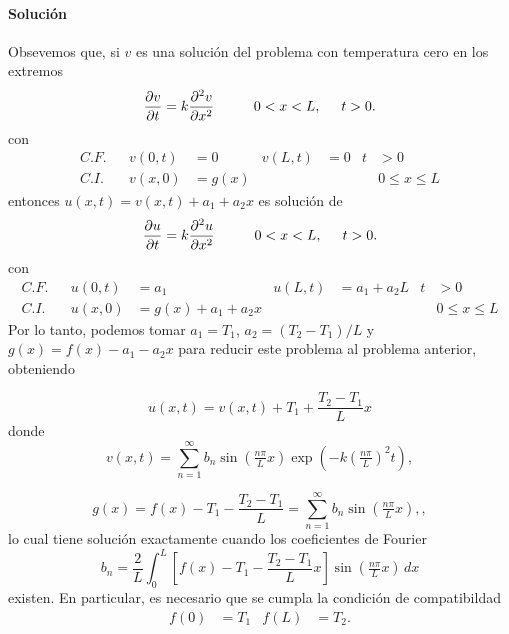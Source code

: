 \documentclass[11pt,letterpaper]{report}
\newcommand\<{\langle}
\renewcommand\>{\rangle}
\begin{document}
\paragraph{Solución}
Obsevemos que, si $v$ es una solución del problema con
temperatura cero en los extremos
\[
  \frac{\partial v}{\partial t}
  = k
  \frac{\partial ^2 v}{\partial x^2}
  \hspace{10mm} 0<x<L,
  \hspace{5mm} t>0.
\]
con
\begin{align*}
  C.F. && v(0,t) &= 0 & v(L,t) &= 0 &t&>0 \\
  C.I. && v(x,0) &= g(x) & &&& 0\leq x\leq L
\end{align*}
entonces $u(x,t)=v(x,t)+a_1+a_2x$ es solución de
\[
  \frac{\partial u}{\partial t}
  = k
  \frac{\partial ^2 u}{\partial x^2}
  \hspace{10mm} 0<x<L,
  \hspace{5mm} t>0.
\]
con
\begin{align*}
  C.F. && u(0,t) &= a_1 & u(L,t) &= a_1+a_2L &t&>0 \\
  C.I. && u(x,0) &= g(x)+a_1+a_2x & &&& 0\leq x\leq L
\end{align*}
Por lo tanto, podemos tomar $a_1=T_1$, $a_2=(T_2-T_1)/L$ y
$g(x)=f(x)-a_1-a_2x$ para reducir este problema al problema
anterior, obteniendo

\[
  u(x,t) = v(x,t) + T_1 + \frac{T_2-T_1}{L}x
\]
donde
\begin{equation}
  v(x,t)
  = \sum_{n=1}^{\infty}
  b_n\sin(\tfrac{n\pi}{L}x)\exp(-k(\tfrac{n\pi}{L})^2t),
\end{equation}

\[
  g(x)
  = f(x)-T_1-\frac{T_2-T_1}{L}
  = \sum_{n=1}^{\infty}
  b_n\sin(\tfrac{n\pi}{L}x),
,\]
lo cual tiene solución exactamente cuando los coeficientes de
Fourier
\[
  b_n = \frac{2}{L}\int_0^L
    \left[f(x) - T_1 - \frac{T_2-T_1}{L}x\right]
    \sin(\tfrac{n\pi}{L}x)\,dx
\]
existen. En particular, es necesario que se cumpla
la condición de compatibildad
\begin{align*}
  f(0) &= T_1 & f(L) &= T_2.
\end{align*}
\end{document}
